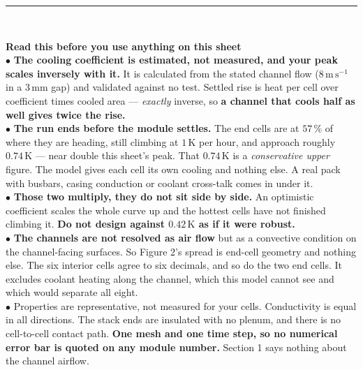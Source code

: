 \documentclass[9pt,a4paper]{article}
\renewcommand{\footnotesize}{\fontsize{6.9}{7.5}\selectfont}
\begin{document}
\vspace{1.5pt}
{\color{rulegrey}\rule{\textwidth}{0.5pt}}\\[1pt]
\begin{minipage}[t]{0.615\textwidth}
\vspace{0pt}
\colorbox{boxgrey}{\begin{minipage}{0.975\textwidth}
{\footnotesize\textbf{Read this before you use anything on this sheet}\\[1pt]
$\bullet$ \textbf{The cooling coefficient is estimated, not measured, and your
peak scales inversely with it.} It is calculated from the stated channel flow
($8\,\mathrm{m\,s^{-1}}$ in a $3\,\mathrm{mm}$ gap) and validated against no
test. Settled rise is heat per cell over coefficient times cooled area ---
\emph{exactly} inverse, so \textbf{a channel that cools half as well gives twice
the rise.}\\
$\bullet$ \textbf{The run ends before the module settles.} The end cells are at
$57\,\%$ of where they are heading, still climbing at $1\,\mathrm{K}$ per hour,
and approach roughly $0.74\,\mathrm{K}$ --- near double this sheet's peak. That
$0.74\,\mathrm{K}$ is a \emph{conservative upper} figure. The model gives each
cell its own cooling and nothing else. A real pack with busbars, casing
conduction or coolant cross-talk comes in under it.\\
$\bullet$ \textbf{Those two multiply, they do not sit side by side.} An
optimistic coefficient scales the whole curve up and the hottest cells have not
finished climbing it. \textbf{Do not design against $0.42\,\mathrm{K}$ as if it
were robust.}\\
$\bullet$ \textbf{The channels are not resolved as air flow} but as a convective
condition on the channel-facing surfaces. So Figure 2's spread is end-cell
geometry and nothing else. The six interior cells agree to six decimals, and so
do the two end cells. It excludes coolant heating along the channel, which this
model cannot see and which would separate all eight.\\
$\bullet$ Properties are representative, not measured for your cells.
Conductivity is equal in all directions. The stack ends are insulated with no
plenum, and there is no cell-to-cell contact path. \textbf{One mesh and one time
step, so no numerical error bar is quoted on any module number.} Section 1 says
nothing about the channel airflow.}
\end{minipage}}
\end{minipage}\hfill
\end{document}
